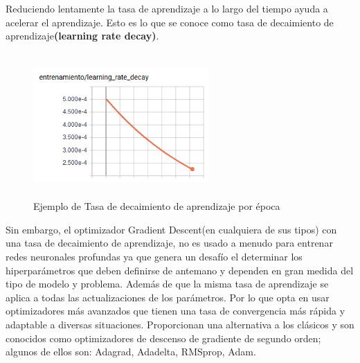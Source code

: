		Reduciendo lentamente la tasa de aprendizaje a lo largo del tiempo ayuda a acelerar el aprendizaje. Esto es lo que se conoce como tasa de decaimiento de aprendizaje{\bf(learning rate decay)}.
			\begin{figure}[H]
				\begin{center}
				\includegraphics[width=0.6\textwidth,height=5.5cm]{images/desarrollo/entrenamiento/LR_decay} 
				\end{center}
				\begin{center}
				\caption{\small{Ejemplo de Tasa de decaimiento de aprendizaje por época  }}
				\vspace{-0.5em}
				{\small{\fontsize{10}{16.8}\selectfont {Fuente propia}}}
				\end{center}
				\vspace{-1.5em}
			\end{figure}
		Sin embargo, el optimizador Gradient Descent(en cualquiera de sus tipos) con una tasa de decaimiento de aprendizaje, no es usado a menudo para entrenar redes neuronales profundas ya que genera un desafío el determinar los hiperparámetros que deben definirse de antemano y dependen en gran medida del tipo de modelo y problema. Además de que la misma tasa de aprendizaje se aplica a todas las actualizaciones de los parámetros. Por lo que opta en usar optimizadores más avanzados que tienen una tasa de convergencia más rápida y adaptable a diversas situaciones. Proporcionan una alternativa a los clásicos y son conocidos como optimizadores de descenso de gradiente de segundo orden; algunos de ellos son: Adagrad, Adadelta, RMSprop, Adam. 

